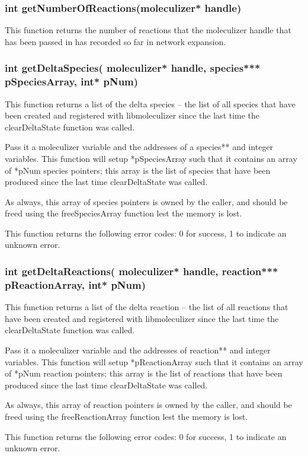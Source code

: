 \subsubsection{int getNumberOfReactions(moleculizer* handle)}
This function returns the number of reactions that the moleculizer
handle that has been passed in has recorded so far in network expansion.

\subsubsection{int getDeltaSpecies( moleculizer* handle, species***
  pSpeciesArray, int* pNum)}
This function returns a list of the delta species -- the list of all
species that have been created and registered with libmoleculizer
since the last time the clearDeltaState function was called.  

Pass it a moleculizer variable and the addresses of a species** and
integer variables.  This function will setup *pSpeciesArray such that
it contains an array of *pNum species pointers; this array is the list
of species that have been produced since the last time clearDeltaState
was called.

As always, this array of species pointers is owned by the caller, and
should be freed using the freeSpeciesArray function lest the memory is
lost.

This function returns the following error codes: 0 for success, 1 to
indicate an unknown error.

\subsubsection{int getDeltaReactions( moleculizer* handle, reaction***
  pReactionArray, int* pNum)}
This function returns a list of the delta reaction -- the list of all
reactions that have been created and registered with libmoleculizer
since the last time the clearDeltaState function was called.

Pass it a moleculizer variable and the addresses of reaction** and
integer variables.  This function will setup *pReactionArray such that
it contains an array of *pNum reaction pointers; this array is the list
of reactions that have been produced since the last time clearDeltaState
was called.

As always, this array of reaction pointers is owned by the caller, and
should be freed using the freeReactionArray function lest the memory is
lost.

This function returns the following error codes: 0 for success, 1 to
indicate an unknown error.

